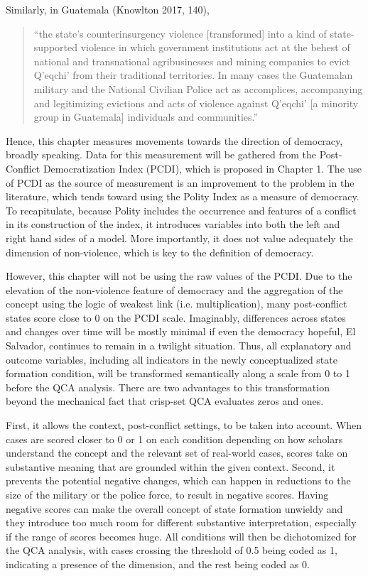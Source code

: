 \documentclass [11pt]{article}
\begin{document}
Similarly, in Guatemala (Knowlton 2017, 140),

\begin{quote}
``the state’s counterinsurgency violence [transformed] into a kind of state-supported violence in which government institutions act at the behest of national and transnational agribusinesses and mining companies to evict Q’eqchi’ from their traditional territories. In many cases the Guatemalan military and the National Civilian Police act as accomplices, accompanying and legitimizing evictions and acts of violence against Q’eqchi’ [a minority group in Guatemala] individuals and communities.''
\end{quote}

Hence, this chapter measures movements towards the direction of democracy, broadly speaking. Data for this measurement will be gathered from the Post-Conflict Democratization Index (PCDI), which is proposed in Chapter 1. The use of PCDI as the source of measurement is an improvement to the problem in the literature, which tends toward using the Polity Index as a measure of democracy. To recapitulate, because Polity includes the occurrence and features of a conflict in its construction of the index, it introduces variables into both the left and right hand sides of a model. More importantly, it does not value adequately the dimension of non-violence, which is key to the definition of democracy.

However, this chapter will not be using the raw values of the PCDI. Due to the elevation of the non-violence feature of democracy and the aggregation of the concept using the logic of weakest link (i.e. multiplication), many post-conflict states score close to 0 on the PCDI scale. Imaginably, differences across states and changes over time will be mostly minimal if even the democracy hopeful, El Salvador, continues to remain in a twilight situation. Thus, all explanatory and outcome variables, including all indicators in the newly conceptualized state formation condition, will be transformed semantically along a scale from 0 to 1 before the QCA analysis. There are two advantages to this transformation beyond the mechanical fact that crisp-set QCA evaluates zeros and ones.

First, it allows the context, post-conflict settings, to be taken into account. When cases are scored closer to 0 or 1 on each condition depending on how scholars understand the concept and the relevant set of real-world cases, scores take on substantive meaning that are grounded within the given context. Second, it prevents the potential negative changes, which can happen in reductions to the size of the military or the police force, to result in negative scores. Having negative scores can make the overall concept of state formation unwieldy and they introduce too much room for different substantive interpretation, especially if the range of scores becomes huge. All conditions will then be dichotomized for the QCA analysis, with cases crossing the threshold of 0.5 being coded as 1, indicating a presence of the dimension, and the rest being coded as 0.
\end{document}
